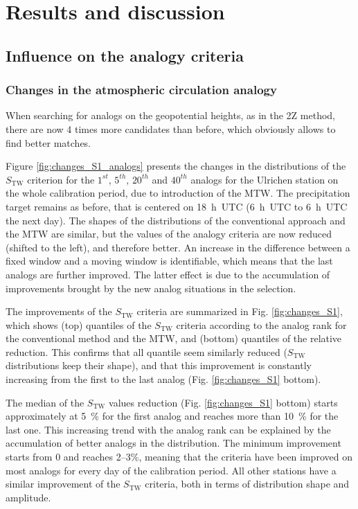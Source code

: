 \documentclass[hess, manuscript]{copernicus}
\begin{document}
\section{Results and discussion}

\subsection{Influence on the analogy criteria}
\label{sec:influence_criteria}

\subsubsection{Changes in the atmospheric circulation analogy}

When searching for analogs on the geopotential heights, as in the 2Z method, there are now 4 times more candidates than before, which obviously allows to find better matches.

Figure \ref{fig:changes_S1_analogs} presents the changes in the distributions of the $S_{\text{TW}}$ criterion for the $1^{st}$, $5^{th}$, $20^{th}$ and $40^{th}$ analogs for the Ulrichen station on the whole calibration period, due to introduction of the MTW. The precipitation target remains as before, that is centered on 18~h~UTC (6~h~UTC to 6~h~UTC the next day). The shapes of the distributions of the conventional approach and the MTW are similar, but the values of the analogy criteria are now reduced (shifted to the left), and therefore better. An increase in the difference between a fixed window and a moving window is identifiable, which means that the last analogs are further improved. The latter effect is due to the accumulation of improvements brought by the new analog situations in the selection.

The improvements of the $S_{\text{TW}}$ criteria are summarized in Fig. \ref{fig:changes_S1}, which shows (top) quantiles of the $S_{\text{TW}}$ criteria according to the analog rank for the conventional method and the MTW, and (bottom) quantiles of the relative reduction. This confirms that all quantile seem similarly reduced ($S_{\text{TW}}$ distributions keep their shape), and that this improvement is constantly increasing from the first to the last analog (Fig. \ref{fig:changes_S1} bottom).

The median of the $S_{\text{TW}}$ values reduction (Fig. \ref{fig:changes_S1} bottom) starts approximately at 5~\% for the first analog and reaches more than 10~\% for the last one. This increasing trend with the analog rank can be explained by the accumulation of better analogs in the distribution. The minimum improvement starts from 0 and reaches 2--3\%, meaning that the criteria have been improved on most analogs for every day of the calibration period. All other stations have a similar improvement of the $S_{\text{TW}}$ criteria, both in terms of distribution shape and amplitude.
\end{document}
